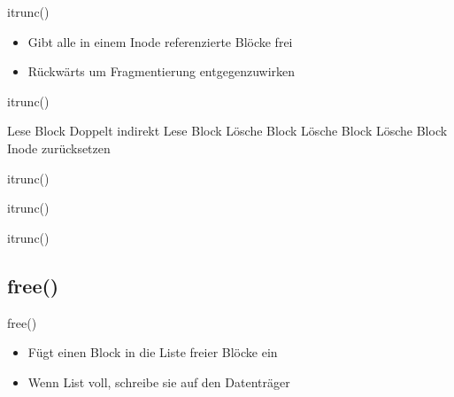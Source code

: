 \documentclass{beamer}
\begin{document}
\begin{frame}{itrunc()}
    \begin{itemize}
        \item Gibt alle in einem Inode referenzierte Blöcke frei
        \medskip
        \item Rückwärts um Fragmentierung entgegenzuwirken
    \end{itemize}
\end{frame}

\begin{frame}{itrunc()}
    \begin{algorithmic}[1]
         \Return \EndIf
                \State Lese Block
                        \Comment Doppelt indirekt
                        \State Lese Block
                            \State Lösche Block
                        \EndFor
                    \EndIf
                    \State Lösche Block
                \EndFor
            \EndIf
            \State Lösche Block
        \EndFor
        \State Inode zurücksetzen
    \end{algorithmic}
\end{frame}

\begin{frame}{itrunc()}
\end{frame}

\begin{frame}{itrunc()}
\end{frame}

\begin{frame}{itrunc()}
\end{frame}




\subsection{free()}

\begin{frame}{free()}
    \begin{itemize}
        \item Fügt einen Block in die Liste freier Blöcke ein
        \medskip
        \item Wenn List voll, schreibe sie auf den Datenträger
    \end{itemize}
\end{frame}
\end{document}
